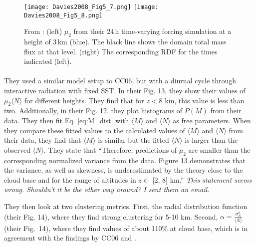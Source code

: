 \documentclass[a4paper, 12pt]{article}
\begin{document}
\begin{figure}[ht]
\noindent \centering
\texttt{[image: Davies2008\_Fig5\_7.png]}
\texttt{[image: Davies2008\_Fig5\_8.png]}\\
\caption{From \cite{Davies2008}: (left) $\mu_2$ from their 24\,h time-varying forcing simulation at a height of 3\,km (blue). The black line shows the domain total mass flux at that level. (right) The corresponding RDF for the times indicated (left).} \label{fig:Davies2008}
\end{figure}


\paragraph{\cite{Davoudi2010}}
They used a similar model setup to CC06, but with a diurnal cycle through interactive radiation with fixed SST. In their Fig. 13, they show their values of $\mu_2 \langle N \rangle$ for different heights. They find that for $z <$8 km, this value is less than two. Additionally, in their Fig. 12. they plot histograms of $P(M)$ from their data. They then fit Eq. \ref{eq:M_dist} with $\langle M \rangle$ and $\langle N \rangle$ as free parameters. When they compare these fitted values to the calculated values of $\langle M \rangle$ and $\langle N \rangle$ from their data, they find that $\langle M \rangle$  is similar but the fitted $\langle N \rangle$ is larger than the observed $\langle N \rangle$. They state that ``Therefore, predictions of $\mu_2$ are smaller than the corresponding normalized variance from the data. Figure 13 demonstrates that the variance, as well as skewness, is underestimated by the theory close to the cloud base and for the range of altitudes in $z \in$  [2, 8] km.'' \textit{This statement seems wrong. Shouldn't it be the other way around? I sent them an email.}

They then look at two clustering metrics. First, the radial distribution function (their Fig. 14), where they find strong clustering for 5-10 km. Second, $\alpha = \frac{\sigma_N^2}{\langle N \rangle}$ (their Fig.~14), where they find values of about 110\% at cloud base, which is in agreement with the findings by CC06 and \cite{Davies2008}. 

\end{document}
